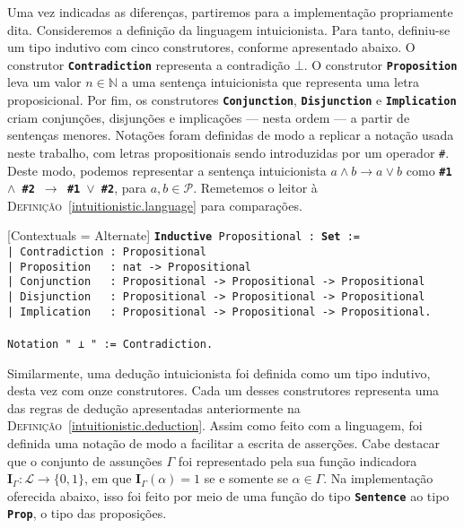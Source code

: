Uma vez indicadas as diferenças, partiremos para a implementação propriamente dita.
Consideremos a definição da linguagem intuicionista.
Para tanto, definiu-se um tipo indutivo com cinco construtores, conforme apresentado abaixo.
O construtor \texttt{\textbf{Contradiction}} representa a contradição $\bot$.
O construtor \texttt{\textbf{Proposition}} leva um valor $n\in\mathbb{N}$ a uma sentença intuicionista que representa uma letra proposicional.
Por fim, os construtores \texttt{\textbf{Conjunction}}, \texttt{\textbf{Disjunction}} e \texttt{\textbf{Implication}} criam conjunções, disjunções e implicações --- nesta ordem --- a partir de sentenças menores.
Notações foram definidas de modo a replicar a notação usada neste trabalho, com letras propositionais sendo introduzidas por um operador \texttt{{\#}}.
Deste modo, podemos representar a sentença intuicionista $a\wedge b\to a\vee b$ como \texttt{\textbf{\#1 $\mathtt{\wedge}$ \#2 $\mathtt{\to}$ \#1 $\mathtt{\vee}$ \#2}}, para $a,b\in\mathcal{P}$.
Remetemos o leitor à \textsc{Definição}~\ref{intuitionistic.language} para comparações.

\vspace{0.5\baselineskip}
\begin{tcolorbox}[enhanced jigsaw, breakable, sharp corners, colframe=black, colback=white, boxrule=0.5pt, left=1.5mm, right=1.5mm, top=1.5mm, bottom=1.5mm]
\setmonofont{Fira Code}[Contextuals = Alternate]
\noindent
\texttt
{\noindent\footnotesize\textbf{Inductive} Propositional : \textbf{Set} :=\\
| Contradiction : Propositional\\
| Proposition\ \ \ : nat -> Propositional\\
| Conjunction\ \ \ : Propositional -> Propositional -> Propositional\\
| Disjunction\ \ \ : Propositional -> Propositional -> Propositional\\
| Implication\ \ \ : Propositional -> Propositional -> Propositional.\\
\\
Notation "\ ⊥\ "\ := Contradiction.
}
\end{tcolorbox}

\vspace{0.5\baselineskip}
Similarmente, uma dedução intuicionista foi definida como um tipo indutivo, desta vez com onze construtores.
Cada um desses construtores representa uma das regras de dedução apresentadas anteriormente na \textsc{Definição}~\ref{intuitionistic.deduction}.
Assim como feito com a linguagem, foi definida uma notação de modo a facilitar a escrita de asserções.
Cabe destacar que o conjunto de assunções $\Gamma$ foi representado pela sua função indicadora $\mathbf{I}_\Gamma:\mathcal{L}\to\{0,1\}$, em que $\mathbf{I}_\Gamma(\alpha)=1$ se e somente se $\alpha\in\Gamma$.
Na implementação oferecida abaixo, isso foi feito por meio de uma função do tipo \texttt{\textbf{Sentence}} ao tipo \texttt{\textbf{Prop}}, o tipo das proposições.

